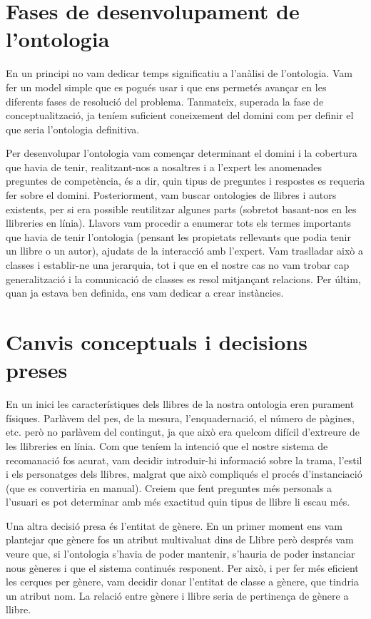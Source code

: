 
\section{Fases de desenvolupament de l'ontologia}

En un principi no vam dedicar temps significatiu a l'anàlisi de l'ontologia. Vam fer un model simple que es pogués usar i que ens permetés avançar en les diferents fases de resolució del problema. Tanmateix, superada la fase de conceptualització, ja teníem suficient coneixement del domini com per definir el que seria l'ontologia definitiva.

Per desenvolupar l'ontologia vam començar determinant el domini i la cobertura que havia de tenir, realitzant-nos a nosaltres i a l'expert les anomenades preguntes de competència, és a dir, quin tipus de preguntes i respostes es requeria fer sobre el domini. Posteriorment, vam buscar ontologies de llibres i autors existents, per si era possible reutilitzar algunes parts (sobretot basant-nos en les llibreries en línia). Llavors vam procedir a enumerar tots els termes importants que havia de tenir l'ontologia (pensant les propietats rellevants que podia tenir un llibre o un autor), ajudats de la interacció amb l'expert. Vam traslladar això a classes i establir-ne una jerarquia, tot i que en el nostre cas no vam trobar cap generalització i la comunicació de classes es resol mitjançant relacions. Per últim, quan ja estava ben definida, ens vam dedicar a crear instàncies.

\section{Canvis conceptuals i decisions preses}

En un inici les característiques dels llibres de la nostra ontologia eren purament físiques. Parlàvem del pes, de la mesura, l'enquadernació, el número de pàgines, etc. però no parlàvem del contingut, ja que això era quelcom difícil d'extreure de les llibreries en línia. Com que teníem la intenció que el nostre sistema de recomanació fos acurat, vam decidir introduir-hi informació sobre la trama, l'estil i els personatges dels llibres, malgrat que això compliqués el procés d'instanciació (que es convertiria en manual). Creiem que fent preguntes més personals a l'usuari es pot determinar amb més exactitud quin tipus de llibre li escau més.

Una altra decisió presa és l'entitat de gènere. En un primer moment ens vam plantejar que gènere fos un atribut multivaluat dins de Llibre però després vam veure que, si l'ontologia s'havia de poder mantenir, s'hauria de poder instanciar nous gèneres i que el sistema continués responent. Per això, i per fer més eficient les cerques per gènere, vam decidir donar l'entitat de classe a gènere, que tindria un atribut nom. La relació entre gènere i llibre seria de pertinença de gènere a llibre.

